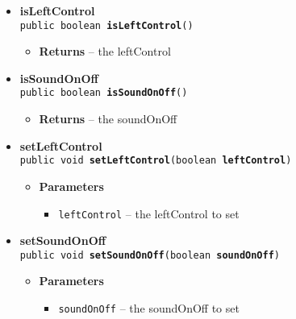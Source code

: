 \documentclass[11pt,a4paper]{report}
\begin{document}
{{{{{\begin{itemize}
{\begin{itemize}
{Checks if the database has a possibly previous copy for the model
}
\item{{\bf  Returns} -- 
true if a records exists; false otherwise 
}%
\end{itemize}
}%
\item{ 
{\bf  isLeftControl}\\
\texttt{public boolean\ {\bf  isLeftControl}()
\label{com.retroMachines.data.models.Setting.isLeftControl()}}%
\begin{itemize}
\item{{\bf  Returns} -- 
the leftControl 
}%
\end{itemize}
}%
\item{ 
{\bf  isSoundOnOff}\\
\texttt{public boolean\ {\bf  isSoundOnOff}()
\label{com.retroMachines.data.models.Setting.isSoundOnOff()}}%
\begin{itemize}
\item{{\bf  Returns} -- 
the soundOnOff 
}%
\end{itemize}
}%
\item{ 
{\bf  setLeftControl}\\
\texttt{public void\ {\bf  setLeftControl}(\texttt{boolean} {\bf  leftControl})
\label{com.retroMachines.data.models.Setting.setLeftControl(boolean)}}%
\begin{itemize}
\item{
{\bf  Parameters}
  \begin{itemize}
   \item{
\texttt{leftControl} -- the leftControl to set}
  \end{itemize}
}%
\end{itemize}
}%
\item{ 
{\bf  setSoundOnOff}\\
\texttt{public void\ {\bf  setSoundOnOff}(\texttt{boolean} {\bf  soundOnOff})
\label{com.retroMachines.data.models.Setting.setSoundOnOff(boolean)}}%
\begin{itemize}
\item{
{\bf  Parameters}
  \begin{itemize}
   \item{
\texttt{soundOnOff} -- the soundOnOff to set}
  \end{itemize}
}%
\end{itemize}
}
\end{itemize}}}}}}
\end{document}
